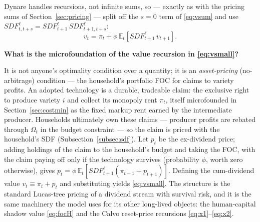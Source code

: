 \documentclass[11pt]{article}
\newcommand{\intuition}[2]{%
  \par\medskip\noindent\hspace*{\fill}%
  \colorbox{intuitionblue}{\parbox{0.94\linewidth}{\textbf{#1}\par\smallskip #2}}%
  \hspace*{\fill}\par\medskip}
\begin{document}
Dynare handles recursions, not infinite sums, so --- exactly as with the
pricing sums of Section~\ref{sec:pricing} --- split off the $s=0$ term of
\eqref{eq:vsum} and use $\mathit{SDF}^{\ell}_{t,t+s} =
\mathit{SDF}^{\ell}_{t+1}\,\mathit{SDF}^{\ell}_{t+1,t+s}$:
\begin{equation}\label{eq:vsmall}
    v_t = \pi_t + \phi\,\mathbb{E}_t\!\left[\mathit{SDF}^{\ell}_{t+1}\,
    v_{t+1}\right].
\end{equation}

\intuition{What is the microfoundation of the value recursion in \eqref{eq:vsmall}?}{%
It is not anyone's optimality condition over a quantity; it is an
\emph{asset-pricing} (no-arbitrage) condition --- the household's portfolio FOC
for claims to variety profits. An adopted technology is a durable, tradeable
claim: the exclusive right to produce variety $i$ and collect its monopoly rent
$\pi_t$, itself microfounded in Section~\ref{sec:costmin} as the fixed markup
rent earned by the intermediate producer.
Households ultimately own these claims --- producer profits are rebated through
$\Omega_t$ in the budget constraint --- so the claim is priced with the
household's SDF (Subsection~\ref{subsec:sdf}). Let $p_t$ be the ex-dividend
price; adding holdings of the claim to the household's budget and taking the
FOC, with the claim paying off only if the technology survives (probability
$\phi$, worth zero otherwise), gives
$p_t = \phi\,\mathbb{E}_t[\mathit{SDF}^{\ell}_{t+1}(\pi_{t+1}+p_{t+1})]$.
Defining the cum-dividend value $v_t \equiv \pi_t + p_t$ and substituting
yields \eqref{eq:vsmall}. The structure is the standard Lucas-tree pricing of a
dividend stream with survival risk, and it is the same machinery the model uses
for its other long-lived objects: the human-capital shadow value
\eqref{eq:focH} and the Calvo reset-price recursions
\eqref{eq:x1}--\eqref{eq:x2}.}
\end{document}
